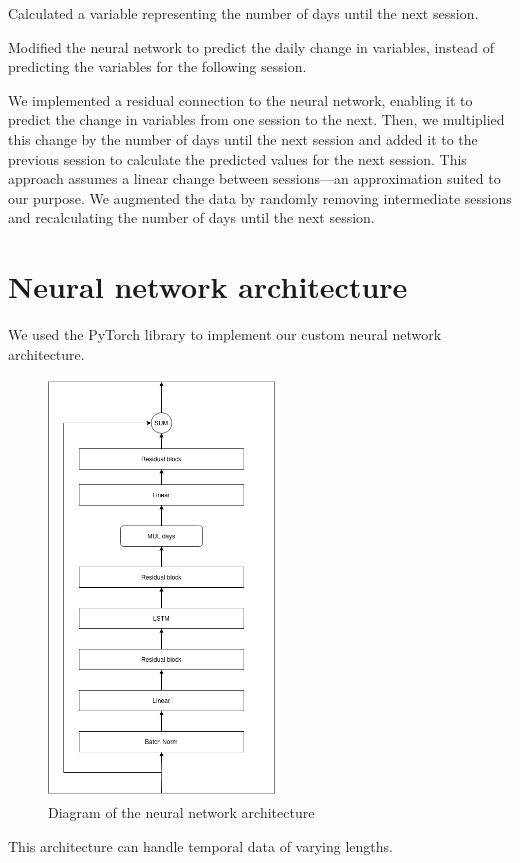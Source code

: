 Calculated a variable representing the number of days until the next session.

Modified the neural network to predict the daily change in variables, instead
of predicting the variables for the following session.

We implemented a residual connection to the neural network, enabling it to
predict the change in variables from one session to the next. Then, we
multiplied this change by the number of days until the next session and added
it to the previous session to calculate the predicted values for the next
session. This approach assumes a linear change between sessions—an
approximation suited to our purpose. We augmented the data by randomly removing
intermediate sessions and recalculating the number of days until the next
session.

\section{Neural network architecture}

We used the PyTorch library to implement our custom neural network
architecture.

\begin{figure}
    \centering
    \includegraphics[width=6cm]{files/nn_diagram}
    \caption{Diagram of the neural network architecture}
\end{figure}

This architecture can handle temporal data of varying lengths.


